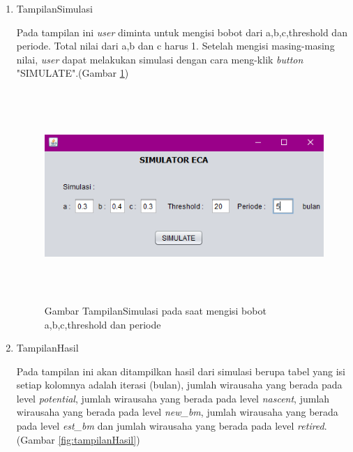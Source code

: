 \begin{enumerate}
	\item TampilanSimulasi
	
	Pada tampilan ini \textit{user} diminta untuk mengisi bobot dari a,b,c,threshold dan periode. Total nilai dari a,b dan c harus 1. Setelah mengisi masing-masing nilai, \textit{user} dapat melakukan simulasi dengan cara meng-klik \textit{button} "SIMULATE".(Gambar \ref{fig:tampilansimulasi})
	
		\begin{figure} [H]
	\centering  
	\includegraphics[width=14cm, height=8cm]{tampilanImplementasiSimulasi1} 
		\caption[Gambar TampilanSimulasi]{Gambar TampilanSimulasi pada saat mengisi bobot a,b,c,threshold dan periode}
	\label{fig:tampilansimulasi} 
\end{figure}

	\item TampilanHasil
	
	Pada tampilan ini akan ditampilkan hasil dari simulasi berupa tabel yang isi setiap kolomnya adalah iterasi (bulan), jumlah wirausaha yang berada pada level \textit{potential}, jumlah wirausaha yang berada pada level \textit{nascent}, jumlah wirausaha yang berada pada level \textit{new\_bm}, jumlah wirausaha yang berada pada level \textit{est\_bm} dan jumlah wirausaha yang berada pada level \textit{retired}. (Gambar \ref{fig:tampilanHasil})
	

\end{enumerate}
